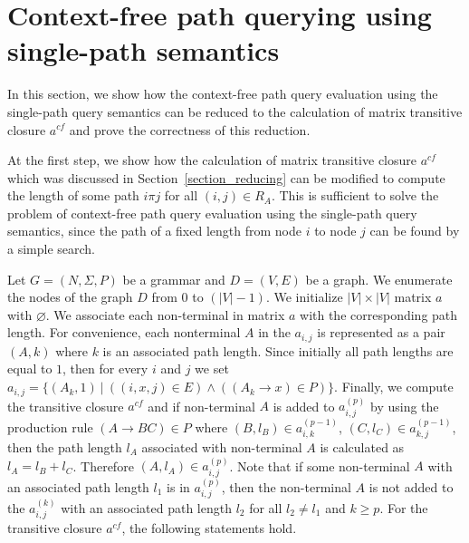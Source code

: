 \section{Context-free path querying using single-path semantics}
In this section, we show how the context-free path query evaluation using the single-path query semantics can be reduced to the calculation of matrix transitive closure $a^{cf}$ and prove the correctness of this reduction.

At the first step, we show how the calculation of matrix transitive closure $a^{cf}$ which was discussed in Section~\ref{section_reducing} can be modified to compute the length of some path $i \pi j$ for all $(i,j) \in R_A$. This is sufficient to solve the problem of context-free path query evaluation using the single-path query semantics, since the path of a fixed length from node $i$ to node $j$ can be found by a simple search.

Let $G = (N,\Sigma,P)$ be a grammar and $D = (V, E)$ be a graph. We enumerate the nodes of the graph $D$ from 0 to $(|V| - 1)$. We initialize $|V| \times |V|$ matrix $a$ with $\varnothing$. We associate each non-terminal in matrix $a$ with the corresponding path length. For convenience, each nonterminal $A$ in the $a_{i,j}$ is represented as a pair $(A,k)$ where $k$ is an associated path length. Since initially all path lengths are equal to $1$, then for every $i$ and $j$ we set $a_{i,j} = \{(A_k,1)~|~((i,x,j) \in E) \wedge ((A_k \rightarrow x) \in P)\}$. Finally, we compute the transitive closure $a^{cf}$ and if non-terminal $A$ is added to $a^{(p)}_{i,j}$ by using the production rule $(A \rightarrow B C) \in P$ where $(B,l_B) \in a^{(p-1)}_{i,k}$, $(C,l_C) \in a^{(p-1)}_{k,j}$, then the path length $l_A$ associated with non-terminal $A$ is calculated as $l_A = l_B + l_C$. Therefore $(A, l_A) \in a^{(p)}_{i,j}$. Note that if some non-terminal $A$ with an associated path length $l_1$ is in $a^{(p)}_{i,j}$, then the non-terminal $A$ is not added to the $a^{(k)}_{i,j}$ with an associated path length $l_2$ for all $l_2 \neq l_1$ and $k \geq p$. For the transitive closure $a^{cf}$, the following statements hold.

